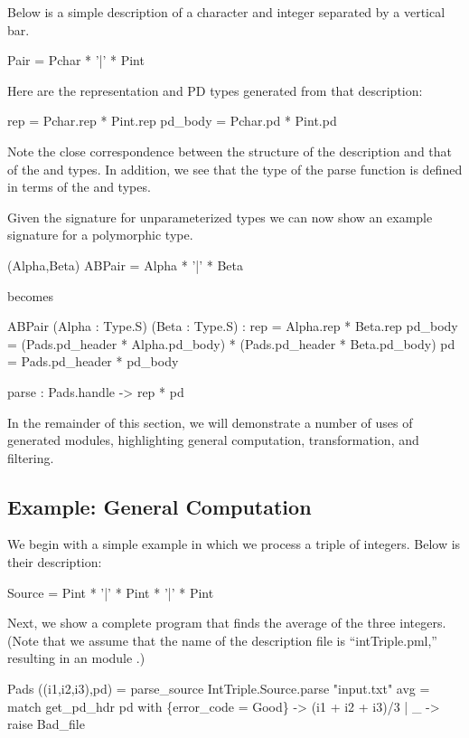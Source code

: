 Below is a simple \padsml{} description of a character
and integer separated by a vertical bar.
\begin{code}\scriptsize
   Pair = Pchar * '|' * Pint\end{code} Here are the
representation and PD types generated from that description:
\begin{code}\scriptsize
{} rep = Pchar.rep * Pint.rep
 pd_body = Pchar.pd  * Pint.pd\end{code}
Note the close correspondence between the structure of the description
and that of the  and  types. In addition, we see
that the type of the parse function is defined in terms of the
 and  types.

Given the signature  for unparameterized types we can now
show an example signature for a polymorphic type.
\begin{code}\scriptsize
{} (Alpha,Beta) ABPair = Alpha * '|' * Beta\end{code}
becomes
\begin{code}\scriptsize
{} ABPair (Alpha : Type.S) (Beta : Type.S) :
   rep = Alpha.rep * Beta.rep
   pd\_body = (Pads.pd_header * Alpha.pd\_body) * 
                 (Pads.pd_header * Beta.pd\_body)
   pd = Pads.pd_header * pd\_body

   parse : Pads.handle -> rep * pd
\end{code}

In the remainder of this section, we will demonstrate a number of uses
of generated modules, highlighting general computation,
transformation, and filtering.

\subsection{Example: General Computation}
\label{sec:ex-process}

We begin with a simple example in which we process a triple of
integers. Below is their description:
\begin{code}\scriptsize
{} Source = Pint * '|' * Pint * '|' * Pint\end{code} Next, we
show a complete \ocaml{} program that finds the average of the three
integers. (Note that we assume that the name of the description file
is ``intTriple.pml,'' resulting in an \ocaml{} module .)
\begin{code}\scriptsize
{} Pads
 ((i1,i2,i3),pd) = 
    parse_source IntTriple.Source.parse "input.txt"
 avg = match get_pd_hdr pd with
    \{error_code = Good\} -> (i1 + i2 + i3)/3
  | _ -> raise Bad_file\end{code}

